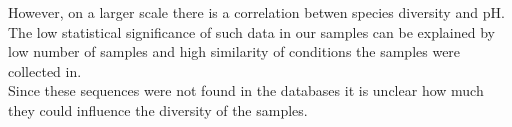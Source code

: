 \documentclass[12pt,twocolumn]{article} %
\begin{document}
\par

However, on a larger scale there is a correlation betwen species diversity and pH\cite{Thompson2017,Fierer2006,Wu2016}. The low statistical significance of such data in our samples can be explained by low number of samples and high similarity of conditions the samples were collected in.
\\
Since these sequences were not found in the databases it is unclear how much they could influence the diversity of the samples.



\newpage

\end{document}
